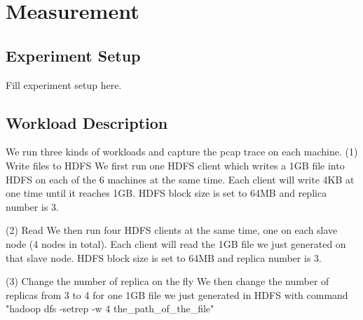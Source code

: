 \section{Measurement}
\label{section:measurement}


\subsection{\bf Experiment Setup}

Fill experiment setup here.

\subsection{\bf Workload Description}
We run three kinds of workloads and capture the pcap trace on each machine.
(1) Write files to HDFS
We first run one HDFS client which writes a 1GB file into HDFS on each of the 6 machines at the same time. Each client will write 4KB at one time until it reaches 1GB. HDFS block size is set to 64MB and replica number is 3.

(2) Read
We then run four HDFS clients at the same time, one on each slave node (4 nodes in total). Each client will read the 1GB file we just generated on that slave node. HDFS block size is set to 64MB and replica number is 3.

(3) Change the number of replica on the fly
We then change the number of replicas from 3 to 4 for one 1GB file we just generated in HDFS with command "hadoop dfs -setrep -w 4 the_path_of_the_file"



